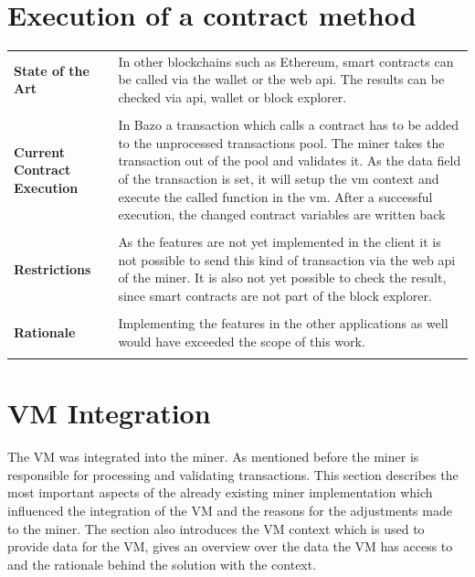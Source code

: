 \section{Execution of a contract method}
\begin{tabular}[t]{ p{3cm} p{12.5cm}}
\raggedright
\textbf{State of the Art} &
In other blockchains such as Ethereum, smart contracts can be called via the wallet or the web api. The results can be checked via api, wallet or block explorer. \\ \\
\raggedright
\textbf{Current Contract Execution} &
In Bazo a transaction which calls a contract has to be added to the unprocessed transactions pool. The miner takes the transaction out of the pool and validates it. As the data field of the transaction is set, it will setup the vm context and execute the called function in the vm. After a successful execution, the changed contract variables are written back \\ \\

\raggedright
\textbf{Restrictions} &
As the features are not yet implemented in the client it is not possible to send this kind of transaction via the web api of the miner. It is also not yet possible to check the result, since smart contracts are not part of the block explorer. \\ \\

\raggedright
\textbf{Rationale} &
Implementing the features in the other applications as well would have exceeded the scope of this work. \\ \\
\end{tabular}

\pagebreak

\section{VM Integration} \label{design_miner}
The VM was integrated into the miner. As mentioned before the miner is responsible for processing and validating transactions. This section describes the most important aspects of the already existing miner implementation which influenced the integration of the VM and the reasons for the adjustments made to the miner. The section also introduces the VM context which is used to provide data for the VM, gives an overview over the data the VM has access to and the rationale behind the solution with the context.

